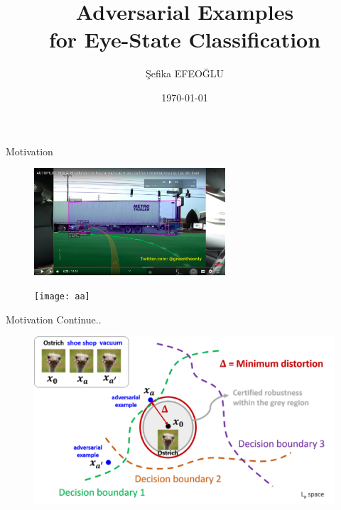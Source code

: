 \documentclass{beamer}		%
\date{\today}	%
\title[Adversarial Examples]{Adversarial Examples\\for Eye-State Classification}	%
\author[Şefika]{Şefika EFEOĞLU} %
\institute{University of Potsdam} %
\begin{document}


\begin{frame}	

\titlepage	%

\end{frame}		
\begin{frame}{Motivation}
   \begin{figure}[!htb]

   \begin{minipage}{0.48\textwidth}
     \centering
     \includegraphics[height=4cm,width=.9\linewidth]{Adversarial_examples_Tesla.png}
   
   \end{minipage}\hfill
   \begin{minipage}{0.48\textwidth}
     \centering
     \texttt{[image: aa]}
 
   \end{minipage}
\end{figure}
\end{frame}
\begin{frame}{Motivation Continue..}
     \begin{figure}
        \centering
        \includegraphics[height= 5 cm] {robustness.png}
    \end{figure}
\end{frame}
\end{document}
